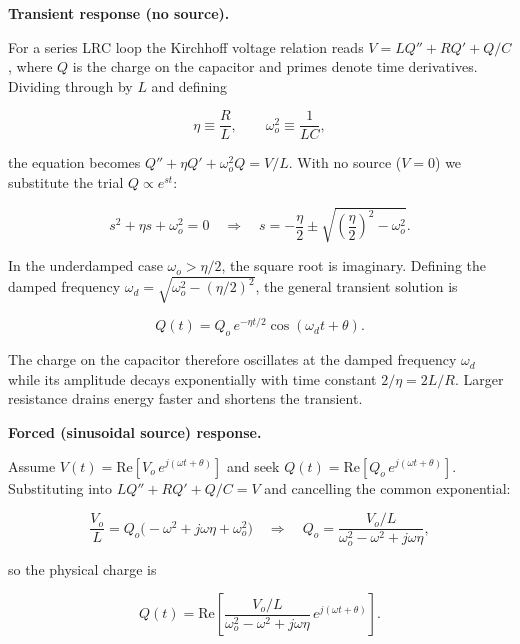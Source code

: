\textbf{Transient response (no source).}

For a series LRC loop the Kirchhoff voltage relation reads $V = LQ'' + RQ' + Q/C$, where $Q$ is the charge on the capacitor and primes denote time derivatives. Dividing through by $L$ and defining

\begin{equation*}
  \eta \equiv \frac{R}{L}, \qquad \omega_o^2 \equiv \frac{1}{LC},
\end{equation*}

the equation becomes $Q'' + \eta Q' + \omega_o^2 Q = V/L$. With no source ($V=0$) we substitute the trial $Q \propto e^{st}$:

\begin{equation*}
  s^2 + \eta s + \omega_o^2 = 0
  \quad\Longrightarrow\quad
  s = -\frac{\eta}{2} \pm \sqrt{\left(\frac{\eta}{2}\right)^{\!2} - \omega_o^2}.
\end{equation*}

In the underdamped case $\omega_o > \eta/2$, the square root is imaginary. Defining the damped frequency $\omega_d = \sqrt{\omega_o^2 - (\eta/2)^2}$, the general transient solution is

\begin{equation*}
  \boxed{Q(t) = Q_o\,e^{-\eta t/2}\cos(\omega_d t + \theta).}
\end{equation*}

The charge on the capacitor therefore oscillates at the damped frequency $\omega_d$ while its amplitude decays exponentially with time constant $2/\eta = 2L/R$. Larger resistance drains energy faster and shortens the transient.

\textbf{Forced (sinusoidal source) response.}

Assume $V(t) = \mathrm{Re}[V_o\,e^{j(\omega t+\theta)}]$ and seek $Q(t) = \mathrm{Re}[Q_o\,e^{j(\omega t+\theta)}]$. Substituting into $L Q'' + R Q' + Q/C = V$ and cancelling the common exponential:

\begin{equation*}
  \frac{V_o}{L} = Q_o\bigl(-\omega^2 + j\omega\eta + \omega_o^2\bigr)
  \quad\Longrightarrow\quad
  Q_o = \frac{V_o/L}{\omega_o^2 - \omega^2 + j\omega\eta},
\end{equation*}

so the physical charge is

\begin{equation*}
  \boxed{Q(t) = \mathrm{Re}\!\left[\frac{V_o/L}{\omega_o^2 - \omega^2 + j\omega\eta}\,e^{j(\omega t+\theta)}\right].}
\end{equation*}


